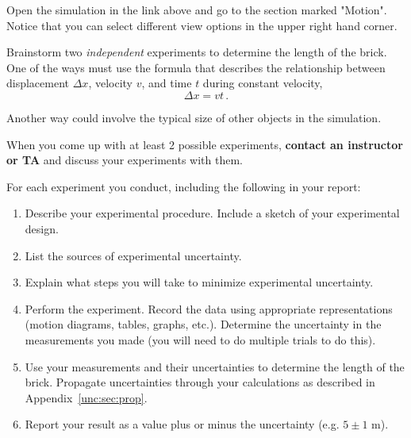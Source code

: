 \begin{steps}
	\item Open the simulation in the link above and go to the section marked "Motion". Notice that you can select different view options in the upper right hand corner.
	
	\item Brainstorm two \textit{independent} experiments to determine the length of the brick. One of the ways must use the formula that describes the relationship between displacement $\Delta x$, velocity $v$, and time $t$ during constant velocity,
\begin{equation}
	 \Delta x = v t \,.
\end{equation}
	
	Another way could involve the typical size of other objects in the simulation.
	
	\item When you come up with at least 2 possible experiments, \textbf{contact an instructor or TA} and discuss your experiments with them.
	
	\item For each experiment you conduct, including the following in your report:
	
	\begin{enumerate}
		\item Describe your experimental procedure. Include a sketch of your experimental design.
		
		\item List the sources of experimental uncertainty.
		
		\item Explain what steps you will take to minimize experimental uncertainty.
		
		\item Perform the experiment. Record the data using appropriate representations (motion diagrams, tables, graphs, etc.). Determine the uncertainty in the measurements you made (you will need to do multiple trials to do this).
		
		\item Use your measurements and their uncertainties to determine the length of the brick. Propagate uncertainties through your calculations as described in Appendix~\ref{unc:sec:prop}.
		
		\item Report your result as a value plus or minus the uncertainty (e.g. $5 \pm 1$ m).
	\end{enumerate}


\end{steps}
